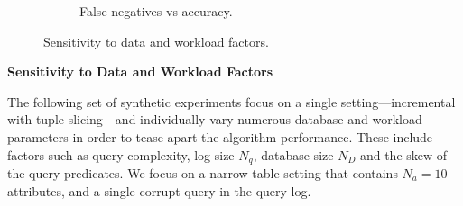 \begin{figure}[h]
\begin{subfigure}[t]{.33\textwidth}
      \vspace*{-.25in}
      \caption{False negatives vs accuracy.}
      \label{f:falsenegative_acc} 
    \end{subfigure}
    \vspace*{-.25in}
    \caption{Sensitivity to data and workload factors. }
  \end{figure}


\noindent\textbf{Sensitivity to Data and Workload Factors}

The following set of synthetic experiments focus on a single \sys setting---incremental with tuple-slicing---and
individually vary numerous database and workload parameters in order to tease apart the algorithm performance.  
These include factors such as query complexity, log size $N_q$, database size $N_D$ and the skew of the query predicates.
We focus on a narrow table setting that contains $N_a = 10$ attributes, and a single corrupt query in the query log.

